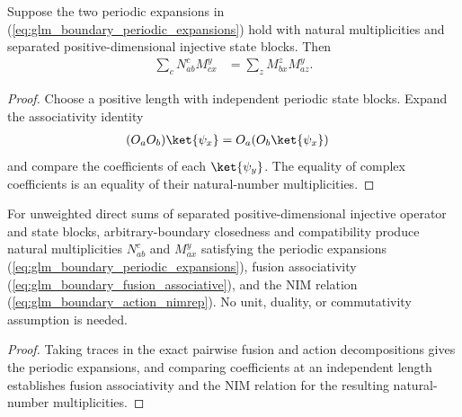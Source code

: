 \begin{lemma}
    \leanok
    \label{thm:glm_boundary_action_nimrep}
    Suppose the two periodic expansions in
    (\ref{eq:glm_boundary_periodic_expansions}) hold with natural
    multiplicities and separated positive-dimensional injective state
    blocks. Then
    \begin{align}
        \sum_cN_{ab}^cM_{cx}^y & =\sum_zM_{bx}^zM_{az}^y.
        \label{eq:glm_boundary_action_nimrep}
    \end{align}
\end{lemma}
\begin{proof}
    \leanok
    Choose a positive length with independent periodic state blocks.
    Expand the associativity identity
    \begin{align*}
        (O_aO_b)\ket{\psi_x} & =O_a(O_b\ket{\psi_x})
    \end{align*}
    and compare the coefficients of each $\ket{\psi_y}$. The equality of complex
    coefficients is an equality of their natural-number multiplicities.
\end{proof}

\begin{lemma}
    \leanok
    \label{thm:glm_boundary_source_multiplicities}
    For unweighted direct sums of separated positive-dimensional
    injective operator and state blocks, arbitrary-boundary closedness
    and compatibility produce natural multiplicities $N_{ab}^c$ and
    $M_{ax}^y$ satisfying the periodic expansions
    (\ref{eq:glm_boundary_periodic_expansions}), fusion associativity
    (\ref{eq:glm_boundary_fusion_associative}), and the NIM relation
    (\ref{eq:glm_boundary_action_nimrep}). No unit, duality, or
    commutativity assumption is needed.
\end{lemma}
\begin{proof}
    \leanok
    Taking traces in the exact pairwise fusion and action decompositions gives
    the periodic expansions, and comparing coefficients at an independent
    length establishes fusion associativity and the NIM relation for the
    resulting natural-number multiplicities.
\end{proof}
